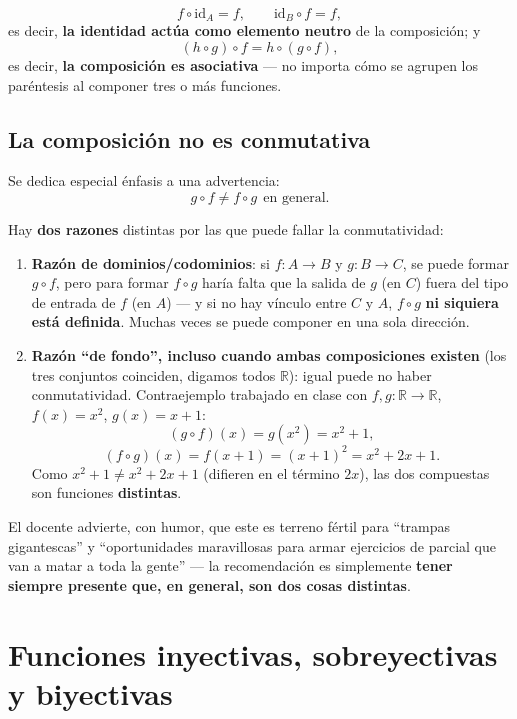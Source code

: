 \documentclass[12pt,a4paper]{article}
\begin{document}
\begin{keybox}
$$f \circ \mathrm{id}_A = f, \qquad \mathrm{id}_B \circ f = f,$$
es decir, \textbf{la identidad actúa como elemento neutro} de la composición; y
$$(h\circ g)\circ f = h\circ(g\circ f),$$
es decir, \textbf{la composición es asociativa} --- no importa cómo se agrupen los paréntesis al componer tres o más funciones.
\end{keybox}

\subsection{La composición no es conmutativa}

Se dedica especial énfasis a una advertencia:
$$\boxed{g \circ f \neq f \circ g \ \ \text{en general.}}$$

Hay \textbf{dos razones} distintas por las que puede fallar la conmutatividad:

\begin{enumerate}
  \item \textbf{Razón de dominios/codominios}: si $f:A\to B$ y $g:B\to C$, se puede formar $g\circ f$, pero para formar $f\circ g$ haría falta que la salida de $g$ (en $C$) fuera del tipo de entrada de $f$ (en $A$) --- y si no hay vínculo entre $C$ y $A$, $f \circ g$ \textbf{ni siquiera está definida}. Muchas veces se puede componer en una sola dirección.
  \item \textbf{Razón ``de fondo'', incluso cuando ambas composiciones existen} (los tres conjuntos coinciden, digamos todos $\mathbb{R}$): igual puede no haber conmutatividad. Contraejemplo trabajado en clase con $f,g:\mathbb{R}\to\mathbb{R}$, $f(x)=x^2$, $g(x)=x+1$:
  $$(g\circ f)(x) = g(x^2) = x^2+1,$$
  $$(f\circ g)(x) = f(x+1) = (x+1)^2 = x^2+2x+1.$$
  Como $x^2+1 \neq x^2+2x+1$ (difieren en el término $2x$), las dos compuestas son funciones \textbf{distintas}.
\end{enumerate}

\begin{warnbox}
El docente advierte, con humor, que este es terreno fértil para ``trampas gigantescas'' y ``oportunidades maravillosas para armar ejercicios de parcial que van a matar a toda la gente'' --- la recomendación es simplemente \textbf{tener siempre presente que, en general, son dos cosas distintas}.
\end{warnbox}

\section{Funciones inyectivas, sobreyectivas y biyectivas}
\label{sec:biyectividad}
\end{document}
